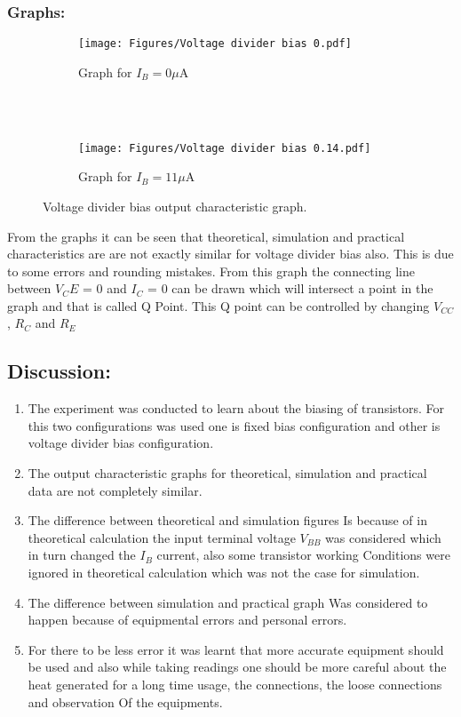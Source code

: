 \documentclass[a4paper, 12pt]{extarticle}
\begin{document}
\newpage
\restoregeometry
{}
\subsubsection{Graphs:}
\begin{figure} [h]
  \begin{subfigure}[b]{1\textwidth}
    \centering
    \texttt{[image: Figures/Voltage divider bias 0.pdf]}
    \caption{Graph for $I_B = 0\mu$A}
    \label{fig:subfig1}
  \end{subfigure}
  \\
  \\
  \begin{subfigure}[b]{1\textwidth}
    \centering
    \texttt{[image: Figures/Voltage divider bias 0.14.pdf]}
    \caption{Graph for $I_B = 11\mu$A}
    \label{fig:subfig2}
  \end{subfigure}
  \caption{Voltage divider bias output characteristic graph.}
  \label{fig:twosubfigures}
\end{figure}
From the graphs it can be seen that theoretical, simulation and practical characteristics are are not exactly similar for voltage divider bias also. This is due to some errors and rounding mistakes. From this graph the connecting line between $V_CE$ = 0 and $I_C$ = 0 can be drawn which will intersect a point in the graph and that is called Q Point. This Q point can be controlled by changing $V_{CC}$, $R_C$ and $R_E$

\newpage
\restoregeometry
{}
\subsection{Discussion:}
\begin{enumerate}
    \item The experiment was conducted to learn about the biasing of transistors. For this two configurations was used one is fixed bias configuration and other is voltage divider bias configuration.
    \item The output characteristic graphs for theoretical, simulation and practical data are not completely similar.
    \item The difference between theoretical and simulation figures Is because of in theoretical calculation the input terminal voltage $V_{BB}$ was considered which in turn changed the $I_B$ current, also some transistor working Conditions were ignored in theoretical calculation which was not the case for simulation.
    \item The difference between simulation and practical graph Was considered to happen because of equipmental errors and personal errors.
    \item For there to be less error it was learnt that more accurate equipment should be used and also while taking readings one should be more careful about the heat generated for a long time usage, the connections, the loose connections and observation Of the equipments.
\end{enumerate}
\end{document}
